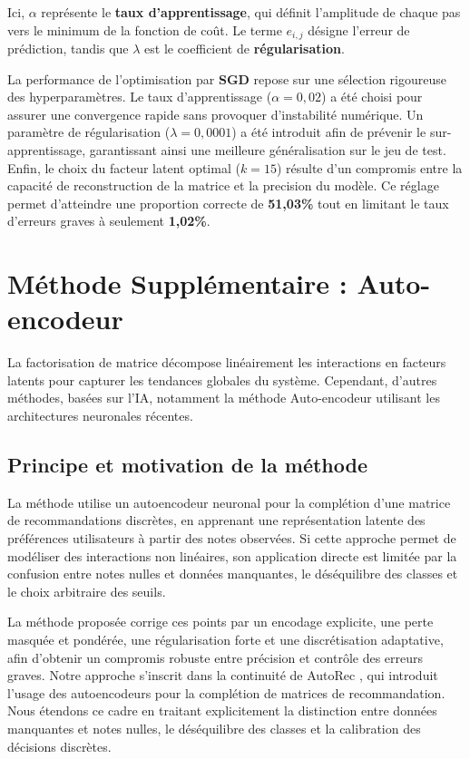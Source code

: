 \documentclass[11pt,a4paper]{article}
\begin{document}
Ici, $\alpha$ représente le \textbf{taux d'apprentissage}, qui définit l'amplitude de chaque pas vers le minimum de la fonction de coût. Le terme $e_{i,j}$ désigne l'erreur de prédiction, tandis que $\lambda$ est le coefficient de \textbf{régularisation}.

La performance de l'optimisation par \textbf{SGD} repose sur une sélection rigoureuse des hyperparamètres. Le taux d'apprentissage ($\alpha = 0,02$) a été choisi pour assurer une convergence rapide sans provoquer d'instabilité numérique. Un paramètre de régularisation ($\lambda = 0,0001$) a été introduit afin de prévenir le sur-apprentissage, garantissant ainsi une meilleure généralisation sur le jeu de test. 
Enfin, le choix du facteur latent optimal ($k=15$) résulte d'un compromis entre la capacité de reconstruction de la matrice et la precision du modèle. Ce réglage permet d'atteindre une proportion correcte  de \textbf{51,03\%} tout en limitant le taux d'erreurs graves à seulement \textbf{1,02\%}. 
\section{Méthode Supplémentaire : Auto-encodeur}
La factorisation de matrice décompose linéairement les interactions en facteurs latents pour capturer les tendances globales du système. Cependant, d'autres méthodes, basées sur l'IA, notamment la méthode Auto-encodeur utilisant les architectures neuronales récentes.
\subsection{Principe et motivation de la méthode}
La méthode utilise un autoencodeur neuronal \citep{sanderson2017neuralnet}  pour la complétion d’une matrice de recommandations discrètes, en apprenant une représentation latente des préférences utilisateurs à partir des notes observées.  
Si cette approche permet de modéliser des interactions non linéaires, son application directe est limitée par la confusion entre notes nulles et données manquantes, le déséquilibre des classes et le choix arbitraire des seuils.

La méthode proposée corrige ces points par un encodage explicite, une perte masquée et pondérée, une régularisation forte et une discrétisation adaptative, afin d’obtenir un compromis robuste entre précision et contrôle des erreurs graves.
Notre approche s’inscrit dans la continuité de AutoRec \citep{sedhain2015autorec}, qui introduit l’usage des autoencodeurs pour la complétion de matrices de recommandation. Nous étendons ce cadre en traitant explicitement la distinction entre données manquantes et notes nulles, le déséquilibre des classes et la calibration des décisions discrètes.
\end{document}
